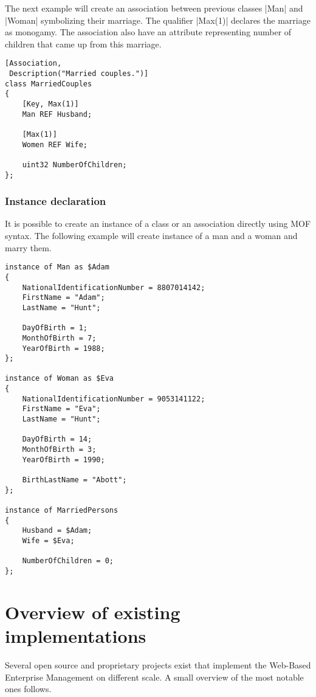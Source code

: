 The next example will create an association between previous classes |Man| and
|Woman| symbolizing their marriage. The qualifier |Max(1)| declares the marriage
as monogamy. The association also have an attribute representing number of
children that came up from this marriage.

\begin{lstlisting}[caption={MOF example: association},
label=lst:wbem:mof:association]
[Association,
 Description("Married couples.")]
class MarriedCouples
{
    [Key, Max(1)]
    Man REF Husband;
    
    [Max(1)]
    Women REF Wife;
    
    uint32 NumberOfChildren;
};
\end{lstlisting}

\subsubsection{Instance declaration}
\label{wbem:cim:mof:instance}

It is possible to create an instance of a class or an association directly using
MOF syntax. The following example will create instance of a man and a woman and
marry them.

\begin{lstlisting}[caption={MOF example: instantiation},
label=lst:wbem:mof:instantiation,
morekeywords={instance, of, as}]
instance of Man as $Adam
{
    NationalIdentificationNumber = 8807014142;
    FirstName = "Adam";
    LastName = "Hunt";

    DayOfBirth = 1;
    MonthOfBirth = 7;
    YearOfBirth = 1988;
};

instance of Woman as $Eva
{
    NationalIdentificationNumber = 9053141122;
    FirstName = "Eva";
    LastName = "Hunt";

    DayOfBirth = 14;
    MonthOfBirth = 3;
    YearOfBirth = 1990;
    
    BirthLastName = "Abott";
};

instance of MarriedPersons
{
    Husband = $Adam;
    Wife = $Eva;
    
    NumberOfChildren = 0;
};
\end{lstlisting}

\section{Overview of existing implementations}
\label{wbem:implementations}

Several open source and proprietary projects exist that implement the Web-Based
Enterprise Management on different scale. A small overview of the most notable
ones follows.

